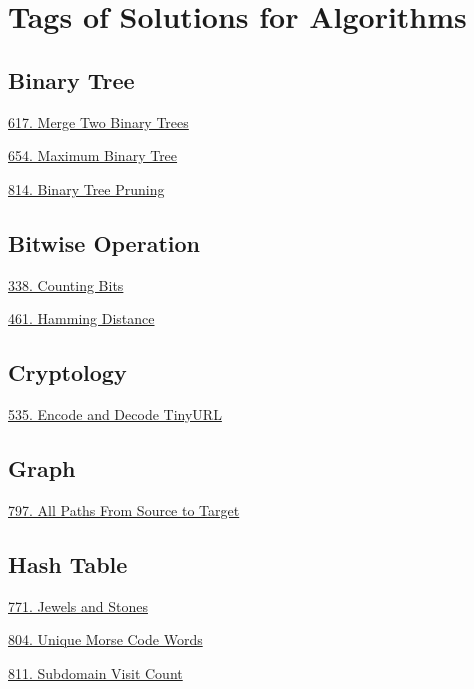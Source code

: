 \tocless\section{Tags of Solutions for Algorithms}
\label{sec:algo_tag}

\subsection*{Binary Tree}
\begin{flushleft}
    \hyperref[algo:617]{617. Merge Two Binary Trees}

    \hyperref[algo:654]{654. Maximum Binary Tree}

    \hyperref[algo:814]{814. Binary Tree Pruning}
\end{flushleft}

\subsection*{Bitwise Operation}
\begin{flushleft}
    \hyperref[algo:338]{338. Counting Bits}

    \hyperref[algo:461]{461. Hamming Distance}
\end{flushleft}

\subsection*{Cryptology}
\begin{flushleft}
    \hyperref[algo:535]{535. Encode and Decode TinyURL}
\end{flushleft}

\subsection*{Graph}
\begin{flushleft}
    \hyperref[algo:797]{797. All Paths From Source to Target}
\end{flushleft}

\subsection*{Hash Table}
\begin{flushleft}
    \hyperref[algo:771]{771. Jewels and Stones}
    
    \hyperref[algo:804]{804. Unique Morse Code Words}
    
    \hyperref[algo:811]{811. Subdomain Visit Count}
\end{flushleft}


